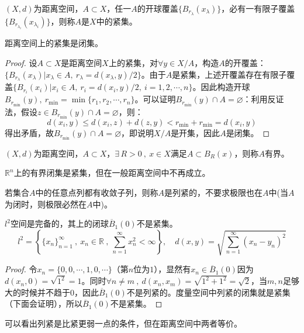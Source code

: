 \begin{definition}[距离空间中的紧集]
    $(X,d)$为距离空间，$A \subset X$，任一$A$的开球覆盖$\{B_{r_{\lambda}}(x_{\lambda})\}$，必有一有限子覆盖$\{B_{r_{\lambda_i}}(x_{\lambda_i})\}$，则称$A$是$X$中的紧集。
\end{definition}
\begin{theorem}
距离空间上的紧集是闭集。
\end{theorem}
\begin{proof}
设$A \subset X$是距离空间$X$上的紧集，对$\forall y \in X/A$，构造$A$的开覆盖：$\{B_{r_{\lambda}}(x_{\lambda})|x_{\lambda} \in A, \ r_{\lambda}=d(x_{\lambda},y)/2\}$。由于$A$是紧集，上述开覆盖存在有限子覆盖$\{B_{r_i}(x_i)|x_i \in A, \ r_i=d(x_i,y)/2, \ i=1,2,\cdots,n\}$。因此构造开球$B_{r_{\min}}(y), \ r_{\min}=\min\{r_1,r_2,\cdots,r_n\}$。可以证明$B_{r_{\min}}(y)\cap A=\varnothing$：利用反证法，假设$z \in B_{r_{\min}}(y)\cap A=\varnothing$，则：
\[d(x_i,y) \leq d(x_i,z)+d(z,y)<r_{\min}+r_{\min}=d(x_i,y)\]
得出矛盾，故$B_{r_{\min}}(y)\cap A=\varnothing$，即说明$X/A$是开集，因此$A$是闭集。
\end{proof}
\begin{definition}[距离空间中的有界性]
    $(X,d)$为距离空间，$A \subset X$，$\exists \, R>0 \ , \ x \in X$满足$A \subset B_R(x)$，则称$A$有界。
\end{definition}
\begin{example}
\quad $\mathbb{R}^n$上的有界闭集是紧集，但在一般距离空间中不再成立。
\end{example}
\begin{definition}[(相对)列紧性]
    若集合$A$中的任意点列都有收敛子列，则称$A$是列紧的，不要求极限也在$A$中(当$A$为闭时，则极限必然在$A$中)。
\end{definition}
\begin{example}
\quad $l^2$空间是完备的，其上的闭球$\overline{B}_1(0)$不是紧集。
\[l^2=\left\{\{x_n\}_{n=1}^{\infty} \ , \ x_n \in \mathbb{R} \ , \ \sum_{n=1}^{\infty}x_n^2<\infty\right\}, \quad d(x,y)=\sqrt{\sum_{n=1}^{\infty}(x_n-y_n)^2}\]
\end{example}
\begin{proof}
令$x_n=\{0,0,\cdots,1,0,\cdots\}$（第$n$位为$1$），显然有$x_n \in \overline{B}_1(0)$因为$d(x_n,0)=\sqrt{1^2}=1$。同时$\forall n \neq m \ , \ d(x_n,x_m)=\sqrt{1^2+1^2}=\sqrt{2}$，当$m,n$足够大的时候并不趋于0，因此$\overline{B}_1(0)$不是列紧的。度量空间中列紧的闭集就是紧集（下面会证明），所以$\overline{B}_1(0)$不是紧集。
\end{proof}
可以看出列紧是比紧更弱一点的条件，但在距离空间中两者等价。
